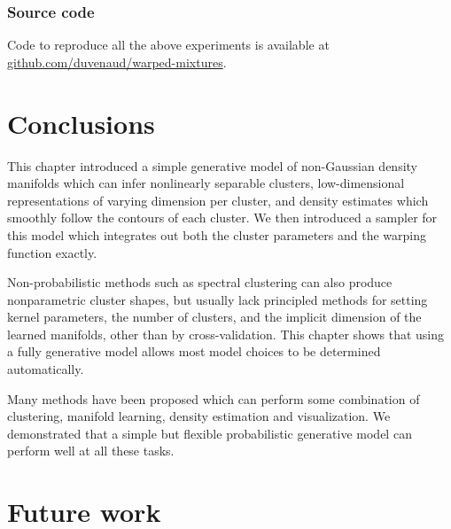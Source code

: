 \subsubsection{Source code}
Code to reproduce all the above experiments is available at \url{github.com/duvenaud/warped-mixtures}.


\section{Conclusions}

This chapter introduced a simple generative model of non-Gaussian density manifolds which can infer nonlinearly separable clusters, low-dimensional representations of varying dimension per cluster, and density estimates which smoothly follow the contours of each cluster.
We then introduced a sampler for this model which integrates out both the cluster parameters and the warping function exactly.

Non-probabilistic methods such as spectral clustering can also produce nonparametric cluster shapes, but usually lack principled methods for setting kernel parameters, the number of clusters, and the implicit dimension of the learned manifolds, other than by cross-validation.
This chapter shows that using a fully generative model allows most model choices to be determined automatically.

Many methods have been proposed which can perform some combination of clustering, manifold learning, density estimation and visualization.
We demonstrated that a simple but flexible probabilistic generative model can perform well at all these tasks.



\section{Future work}


